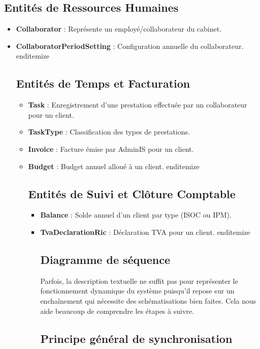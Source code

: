 \begin{itemize}
\begin{itemize}
\begin{itemize}
\subsection{Entités de Ressources Humaines}

\begin{itemize}
    \item \textbf{Collaborator} : Représente un employé/collaborateur du cabinet.
    \item \textbf{CollaboratorPeriodSetting} : Configuration annuelle du collaborateur.
end{itemize}

\subsection{Entités de Temps et Facturation}

\begin{itemize}
    \item \textbf{Task} : Enregistrement d'une prestation effectuée par un collaborateur pour un client.
    \item \textbf{TaskType} : Classification des types de prestations.
    \item \textbf{Invoice} : Facture émise par AdminIS pour un client.
    \item \textbf{Budget} : Budget annuel alloué à un client.
end{itemize}

\subsection{Entités de Suivi et Clôture Comptable}

\begin{itemize}
    \item \textbf{Balance} : Solde annuel d'un client par type (ISOC ou IPM).
    \item \textbf{TvaDeclarationRic} : Déclaration TVA pour un client.
end{itemize}

\section{Diagramme de séquence}

Parfois, la description textuelle ne suffit pas pour représenter le fonctionnement dynamique du système puisqu'il repose sur un enchaînement qui nécessite des schématisations bien faites. Cela nous aide beaucoup de comprendre les étapes à suivre.

\subsection{Principe général de synchronisation}


\end{itemize}
\end{itemize}
\end{itemize}
\end{itemize}
\end{itemize}
\end{itemize}
